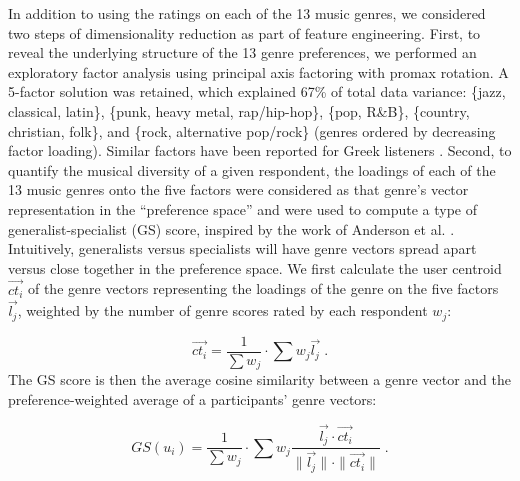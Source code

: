 \documentclass{article}
\begin{document}
In addition to using the ratings on each of the 13 music genres, we considered two steps of dimensionality reduction as part of feature engineering. First, to reveal the underlying structure of the 13 genre preferences, we performed an exploratory factor analysis using principal axis factoring with promax rotation. A 5-factor solution was retained, which explained 67\% of total data variance: \{jazz, classical, latin\}, \{punk, heavy metal, rap/hip-hop\}, \{pop, R\&B\}, \{country, christian, folk\}, and \{rock, alternative pop/rock\} (genres ordered by decreasing factor loading). Similar factors have been reported for Greek listeners \cite{gardikiotis2012rock}. 
Second, to quantify the musical diversity of a given respondent, the loadings of each of the 13 music genres onto the five factors were considered as that genre's vector representation in the ``preference space'' and were used to compute a type of generalist-specialist (GS) score, inspired by the work of Anderson et al. \cite{anderson2020algorithmic}. Intuitively, generalists versus specialists will have genre vectors spread apart versus close together in the preference space.  
We first calculate the user centroid $\overrightarrow{ct_i}$ of the genre vectors representing the loadings of the genre on the five factors $\overrightarrow{l_j}$, weighted by the number of genre scores rated by each respondent $w_j$: 

\begin{equation}
  \overrightarrow{ct_i} = \frac{1}{\sum{w_j}} \cdot \sum{w_j \overrightarrow{l_j}} \;  .
\end{equation}
%
The GS score is then the average cosine similarity between a genre vector and the preference-weighted average of a participants' genre vectors: 

\begin{equation}
    GS(u_i) = \frac{1}{\sum{w_j}} \cdot \sum w_j \frac{\overrightarrow{l_j} \cdot \overrightarrow{ct_i}}{\parallel{\overrightarrow{l_j}\parallel} \cdot \parallel{\overrightarrow{ct_i}}\parallel } \;  .
\end{equation}
\end{document}
